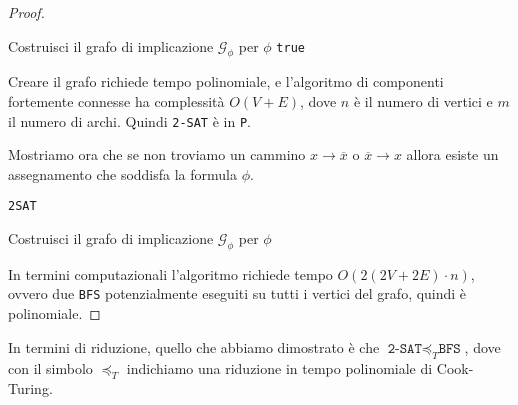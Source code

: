 \begin{proof}
\begin{algorithm}[H]
        Costruisci il grafo di implicazione $\mathcal{G}_\phi$ per $\phi$ \;
        \Return \texttt{true} 
    \end{algorithm}
    
    Creare il grafo richiede tempo polinomiale, e l'algoritmo di componenti fortemente connesse
    ha complessità $O(V + E)$, dove $n$ è il numero di vertici e $m$ il numero di archi.
    Quindi \texttt{2-SAT} è in \texttt{P}.

    Mostriamo ora che se non troviamo un cammino $x \rightarrow \overline{x}$ o $\overline{x} \rightarrow x$
    allora esiste un assegnamento che soddisfa la formula $\phi$.

    \begin{algorithm}[H]
        \caption{\texttt{2SAT}}
        \DontPrintSemicolon  


        \BlankLine
        Costruisci il grafo di implicazione $\mathcal{G}_\phi$ per $\phi$ \;
    \end{algorithm}
    In termini computazionali l'algoritmo richiede tempo $O(2(2V + 2E)\cdot n)$, ovvero due 
    \texttt{BFS} potenzialmente eseguiti su tutti i vertici del grafo, quindi è polinomiale.
\end{proof}

In termini di riduzione, quello che abbiamo dimostrato è che $\texttt{2-SAT} \preceq_T \texttt{BFS}$,
dove con il simbolo $\preceq_T$ indichiamo una riduzione in tempo polinomiale di Cook-Turing.

